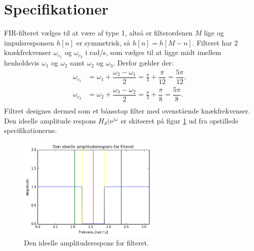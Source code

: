 \section{Specifikationer}
FIR-filteret vælges til at være af type 1, altså er filterordenen $M$ lige og impulsresponsen $h[n]$ er symmetrisk, så $h[n] = h[M - n]$. Filteret har 2 knækfrekvenser $\omega_{c_1}$ og $\omega_{c_2}$ i rad/s, som vælges til at ligge midt imellem henholdsvis $\omega_1$ og $\omega_2$ samt $\omega_2$ og $\omega_3$. Derfor gælder der:
\begin{align*}
\omega_{c_1} &= \omega_1 + \dfrac{\omega_2 - \omega_1}{2} = \frac{\pi}{3} + \dfrac{\pi}{12} = \dfrac{5\pi}{12}, \\
\omega_{c_2} &= \omega_2 + \dfrac{\omega_3 - \omega_2}{2} = \frac{\pi}{2} + \dfrac{\pi}{8} = \dfrac{5\pi}{8}. \\
\end{align*}
Filtret designes dermed som et bånsstop filter med ovenstående knækfrekvenser. Den ideelle amplitude respons $H_d(\text{e}^{j\omega}$ er skitseret på figur \ref{fig:ideel_amp_respons} ud fra opstillede specifikationerne.   
\begin{figure}[H]
    \centering
    \includegraphics[width = 0.6\textwidth]{figures/ideel_amp_respons.PNG}
    \caption{Den ideelle amplituderespons for filteret.}
    \label{fig:ideel_amp_respons}
\end{figure}
